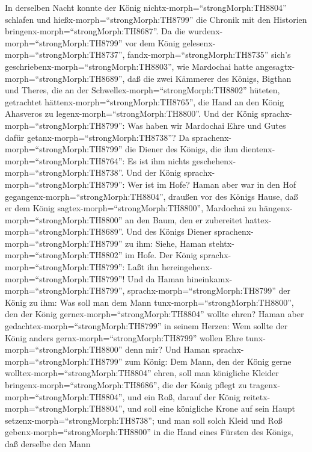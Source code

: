  In derselben Nacht konnte der König
nichtx-morph=``strongMorph:TH8804'' schlafen und
hießx-morph=``strongMorph:TH8799'' die Chronik mit den Historien
bringenx-morph=``strongMorph:TH8687''. Da die
wurdenx-morph=``strongMorph:TH8799'' vor dem König
gelesenx-morph=``strongMorph:TH8737'', 
fandx-morph=``strongMorph:TH8735'' sich's
geschriebenx-morph=``strongMorph:TH8803'', wie Mardochai hatte
angesagtx-morph=``strongMorph:TH8689'', daß die zwei Kämmerer des
Königs, Bigthan und Theres, die an der
Schwellex-morph=``strongMorph:TH8802'' hüteten, getrachtet
hättenx-morph=``strongMorph:TH8765'', die Hand an den König Ahasveros zu
legenx-morph=``strongMorph:TH8800''.  Und der König
sprachx-morph=``strongMorph:TH8799'': Was haben wir Mardochai Ehre und
Gutes dafür getanx-morph=``strongMorph:TH8738''? Da
sprachenx-morph=``strongMorph:TH8799'' die Diener des Königs, die ihm
dientenx-morph=``strongMorph:TH8764'': Es ist ihm nichts
geschehenx-morph=``strongMorph:TH8738''.  Und der König
sprachx-morph=``strongMorph:TH8799'': Wer ist im Hofe? Haman aber war in
den Hof gegangenx-morph=``strongMorph:TH8804'', draußen vor des Königs
Hause, daß er dem König sagtex-morph=``strongMorph:TH8800'', Mardochai
zu hängenx-morph=``strongMorph:TH8800'' an den Baum, den er zubereitet
hattex-morph=``strongMorph:TH8689''.  Und des Königs Diener
sprachenx-morph=``strongMorph:TH8799'' zu ihm: Siehe, Haman
stehtx-morph=``strongMorph:TH8802'' im Hofe. Der König
sprachx-morph=``strongMorph:TH8799'': Laßt ihn
hereingehenx-morph=``strongMorph:TH8799''!  Und da Haman
hineinkamx-morph=``strongMorph:TH8799'',
sprachx-morph=``strongMorph:TH8799'' der König zu ihm: Was soll man dem
Mann tunx-morph=``strongMorph:TH8800'', den der König
gernex-morph=``strongMorph:TH8804'' wollte ehren? Haman aber
gedachtex-morph=``strongMorph:TH8799'' in seinem Herzen: Wem sollte der
König anders gernx-morph=``strongMorph:TH8799'' wollen Ehre
tunx-morph=``strongMorph:TH8800'' denn mir?  Und Haman
sprachx-morph=``strongMorph:TH8799'' zum König: Dem Mann, den der König
gerne wolltex-morph=``strongMorph:TH8804'' ehren,  soll man
königliche Kleider bringenx-morph=``strongMorph:TH8686'', die der König
pflegt zu tragenx-morph=``strongMorph:TH8804'', und ein Roß, darauf der
König reitetx-morph=``strongMorph:TH8804'', und soll eine königliche
Krone auf sein Haupt setzenx-morph=``strongMorph:TH8738''; 
und man soll solch Kleid und Roß gebenx-morph=``strongMorph:TH8800'' in
die Hand eines Fürsten des Königs, daß derselbe den Mann
